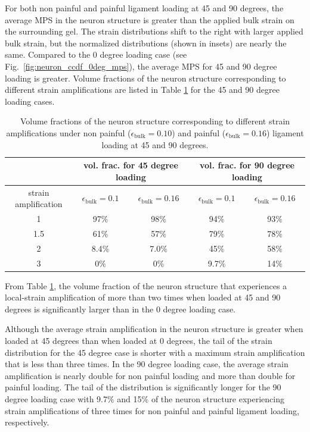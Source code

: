 \documentclass[]{interact}
\begin{document}
For both non painful and painful ligament loading at 45 and 90 degrees, the average MPS in the neuron structure is greater than the applied bulk strain on the surrounding gel. The strain distributions shift to the right with larger applied bulk strain, but the normalized distributions (shown in insets) are nearly the same. Compared to the 0 degree loading case (see Fig.\ \ref{fig:neuron_ccdf_0deg_mps}), the average MPS for 45 and 90 degree loading is greater. Volume fractions of the neuron structure corresponding to different strain amplifications are listed in Table \ref{table:ccdf_volfrac_compare} for the 45 and 90 degree loading cases.
\begin{table}[ht]
\begin{center}
\begin{tabular}{ c c c c c }
\hline\hline
& \multicolumn{2}{c}{vol. frac. for 45 degree loading} & \multicolumn{2}{c}{vol. frac. for 90 degree loading} \\ \hline 
strain amplification & $\epsilon_{\text{bulk}}=0.1$ & $\epsilon_{\text{bulk}}=0.16$ & $\epsilon_{\text{bulk}}=0.1$ & $\epsilon_{\text{bulk}}=0.16$ \\
\hline 
1 & 97$\%$ & 98$\%$ & 94$\%$ & 93$\%$\\ 
1.5 & 61$\%$ & 57$\%$ & 79$\%$ & 78$\%$\\
2 & 8.4$\%$ &  7.0$\%$ & 45$\%$ &  58$\%$\\ 
3 & 0$\%$ & 0$\%$ & 9.7$\%$ & 14$\%$\\ \hline \hline
\end{tabular}
\end{center}
\caption{Volume fractions of the neuron structure corresponding to different strain amplifications under non painful ($\epsilon_{\text{bulk}}=0.10$) and painful ($\epsilon_{\text{bulk}}=0.16$) ligament loading at 45 and 90 degrees.}
\label{table:ccdf_volfrac_compare}
\end{table}
From Table \ref{table:ccdf_volfrac_compare}, the volume fraction of the neuron structure that experiences a local-strain amplification of more than two times when loaded at 45 and 90 degrees is significantly larger than in the 0 degree loading case.

Although the average strain amplification in the neuron structure is greater when loaded at 45 degrees than when loaded at 0 degrees, the tail of the strain distribution for the 45 degree case is shorter with a maximum strain amplification that is less than three times. In the 90 degree loading case, the average strain amplification is nearly double for non painful loading and more than double for painful loading. The tail of the distribution is significantly longer for the 90 degree loading case with 9.7$\%$ and 15$\%$ of the neuron structure experiencing strain amplifications of three times for non painful and painful ligament loading, respectively.
\end{document}
